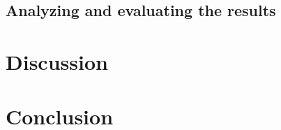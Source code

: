 \subsection{Analyzing and evaluating the results}
\label{subsection:AnalyingResults}




\section{Discussion}
\label{section:Discussion}




\section{Conclusion}
\label{section:Conclusion}